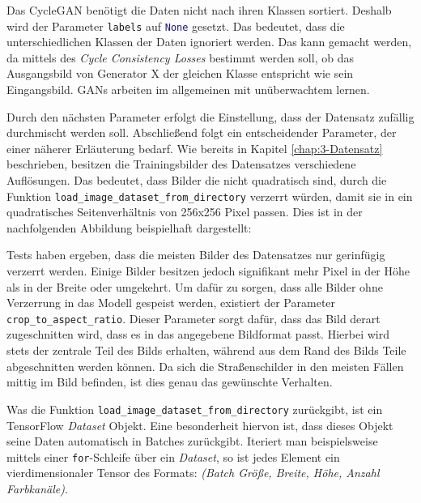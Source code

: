 
Das \ac{CycleGAN} benötigt die Daten nicht nach ihren Klassen sortiert. Deshalb wird der Parameter \lstinline{labels} auf \lstinline[language=python]{None} gesetzt. Das bedeutet, dass die unterschiedlichen Klassen der Daten ignoriert werden. Das kann gemacht werden, da mittels des \emph{Cycle Consistency Losses} bestimmt werden soll, ob das Ausgangsbild von Generator X der gleichen Klasse entspricht wie sein Eingangsbild. \acp{GAN} arbeiten im allgemeinen mit unüberwachtem lernen.

Durch den nächsten Parameter erfolgt die Einstellung, dass der Datensatz zufällig durchmischt werden soll. Abschließend folgt ein entscheidender Parameter, der einer näherer Erläuterung bedarf. Wie bereits in Kapitel \ref{chap:3-Datensatz} beschrieben, besitzen die Trainingsbilder des Datensatzes verschiedene Auflösungen. Das bedeutet, dass Bilder die nicht quadratisch sind, durch die Funktion \lstinline{load_image_dataset_from_directory} verzerrt würden, damit sie in ein quadratisches Seitenverhältnis von 256x256 Pixel passen. Dies ist in der nachfolgenden Abbildung beispielhaft dargestellt:


Tests haben ergeben, dass die meisten Bilder des Datensatzes nur gerinfügig verzerrt werden. Einige Bilder besitzen jedoch signifikant mehr Pixel in der Höhe als in der Breite oder umgekehrt. Um dafür zu sorgen, dass alle Bilder ohne Verzerrung in das Modell gespeist werden, existiert der Parameter \lstinline{crop_to_aspect_ratio}. Dieser Parameter sorgt dafür, dass das Bild derart zugeschnitten wird, dass es in das angegebene Bildformat passt. Hierbei wird stets der zentrale Teil des Bilds erhalten, während aus dem Rand des Bilds Teile abgeschnitten werden können. Da sich die Straßenschilder in den meisten Fällen mittig im Bild befinden, ist dies genau das gewünschte Verhalten.

Was die Funktion \lstinline{load_image_dataset_from_directory} zurückgibt, ist ein TensorFlow \emph{Dataset} Objekt. Eine besonderheit hiervon ist, dass dieses Objekt seine Daten automatisch in Batches zurückgibt. Iteriert man beispielsweise mittels einer \lstinline{for}-Schleife über ein \emph{Dataset}, so ist jedes Element ein vierdimensionaler Tensor des Formats: \emph{(Batch Größe, Breite, Höhe, Anzahl Farbkanäle)}. \cite{tf-dataset}

